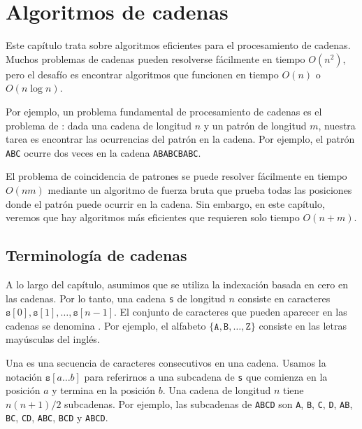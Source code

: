 \chapter{Algoritmos de cadenas}

Este capítulo trata sobre algoritmos eficientes
para el procesamiento de cadenas.
Muchos problemas de cadenas pueden resolverse fácilmente
en tiempo $O(n^2)$, pero el desafío es
encontrar algoritmos que funcionen en tiempo $O(n)$ o $O(n \log n)$.


Por ejemplo, un problema fundamental de procesamiento de cadenas
es el problema de :
dada una cadena de longitud $n$ y un patrón de longitud $m$,
nuestra tarea es encontrar las ocurrencias del patrón
en la cadena.
Por ejemplo, el patrón \texttt{ABC} ocurre dos
veces en la cadena \texttt{ABABCBABC}.

El problema de coincidencia de patrones se puede resolver fácilmente
en tiempo $O(nm)$ mediante un algoritmo de fuerza bruta que
prueba todas las posiciones donde el patrón puede
ocurrir en la cadena.
Sin embargo, en este capítulo, veremos que hay
algoritmos más eficientes que requieren solo
tiempo $O(n+m)$.


\section{Terminología de cadenas}


A lo largo del capítulo, asumimos que
se utiliza la indexación basada en cero en las cadenas.
Por lo tanto, una cadena \texttt{s} de longitud $n$
consiste en caracteres
$\texttt{s}[0],\texttt{s}[1],\ldots,\texttt{s}[n-1]$.
El conjunto de caracteres que pueden aparecer
en las cadenas se denomina .
Por ejemplo, el alfabeto
$\{\texttt{A},\texttt{B},\ldots,\texttt{Z}\}$
consiste en las letras mayúsculas del inglés.


Una  es una secuencia de caracteres consecutivos
en una cadena.
Usamos la notación $\texttt{s}[a \ldots b]$
para referirnos a una subcadena de \texttt{s}
que comienza en la posición $a$ y termina en la posición $b$.
Una cadena de longitud $n$ tiene $n(n+1)/2$ subcadenas.
Por ejemplo, las subcadenas de
\texttt{ABCD} son
\texttt{A}, \texttt{B}, \texttt{C}, \texttt{D},
\texttt{AB}, \texttt{BC}, \texttt{CD},
\texttt{ABC}, \texttt{BCD} y \texttt{ABCD}.

